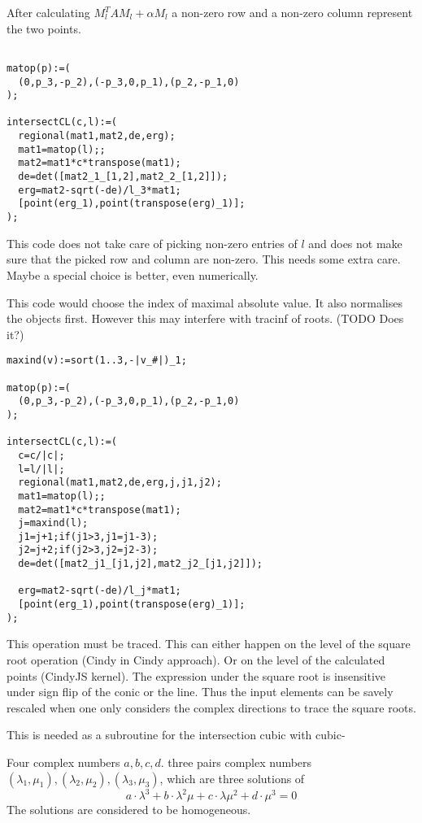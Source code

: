 \documentclass[11pt]{article}
\newcounter{subsubsubsection}[subsubsection]
\begin{document}
After calculating $M_l^TAM_l+\alpha M_l$ a non-zero row and a non-zero column represent the two points.


\medskip
{}

\begin{verbatim}

matop(p):=(
  (0,p_3,-p_2),(-p_3,0,p_1),(p_2,-p_1,0)
);

intersectCL(c,l):=(
  regional(mat1,mat2,de,erg);
  mat1=matop(l);;
  mat2=mat1*c*transpose(mat1);
  de=det([mat2_1_[1,2],mat2_2_[1,2]]);
  erg=mat2-sqrt(-de)/l_3*mat1;
  [point(erg_1),point(transpose(erg)_1)];
);
\end{verbatim}

This code does not take care of picking non-zero entries of $l$ and does not make sure that the picked row and column are non-zero.
This needs some extra care. Maybe a special choice is better, even numerically.

This code would choose the index of maximal absolute value. It also normalises the objects first. However this may interfere with tracinf of roots. (TODO Does it?)

\begin{verbatim}
maxind(v):=sort(1..3,-|v_#|)_1;

matop(p):=(
  (0,p_3,-p_2),(-p_3,0,p_1),(p_2,-p_1,0)
);

intersectCL(c,l):=(
  c=c/|c|;
  l=l/|l|;
  regional(mat1,mat2,de,erg,j,j1,j2);
  mat1=matop(l);;
  mat2=mat1*c*transpose(mat1);
  j=maxind(l);
  j1=j+1;if(j1>3,j1=j1-3);
  j2=j+2;if(j2>3,j2=j2-3);
  de=det([mat2_j1_[j1,j2],mat2_j2_[j1,j2]]);

  erg=mat2-sqrt(-de)/l_j*mat1;
  [point(erg_1),point(transpose(erg)_1)];
);
\end{verbatim}


\medskip
{}
This operation must be traced. This can either happen on the level of the square root operation (Cindy in Cindy approach). Or on the level
of the calculated points (CindyJS kernel).
The expression under the square root is insensitive  under sign flip of the conic or the line. Thus the input elements can be savely rescaled 
when one only considers the complex directions to trace the square roots.

\medskip
{}
This is needed as a subroutine for the intersection cubic with cubic-
 
\medskip
{} Four complex numbers $a,b,c,d$.  three pairs complex numbers 
$(\lambda_1,\mu_1), (\lambda_2,\mu_2), (\lambda_3,\mu_3)$, which are three solutions of
\[
a\cdot\lambda^3+
b\cdot\lambda^2\mu+
c\cdot\lambda\mu^2+
d\cdot\mu^3=0
\]
The solutions are considered to be homogeneous.
\end{document}
